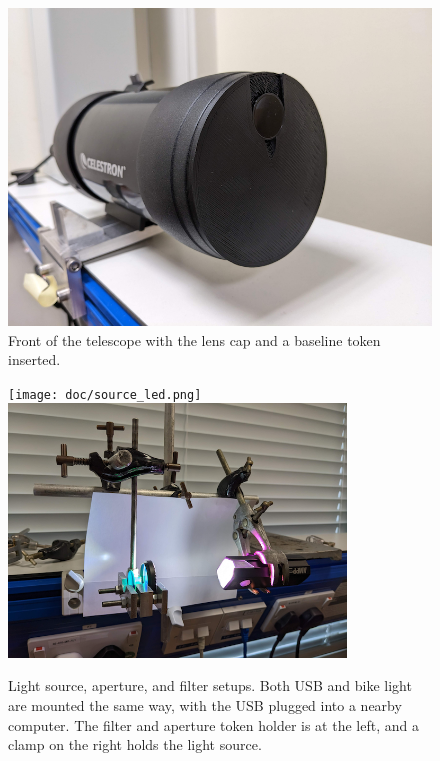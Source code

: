\documentclass[11pt]{article}
\begin{document}
\begin{figure}[h]
    \centering
    \includegraphics[width=1\textwidth]{doc/tel2.png}
    \caption{Front of the telescope with the lens cap and a baseline token inserted.}
    \label{fig:tel2}
\end{figure}

\begin{figure}[h]
    \centering
    \texttt{[image: doc/source\_led.png]}
    \includegraphics[width=0.8\textwidth]{doc/source.png}
    \caption{Light source, aperture, and filter setups. Both USB and bike light are mounted the same way, with the USB plugged into a nearby computer. The filter and aperture token holder is at the left, and a clamp on the right holds the light source.}
    \label{fig:source}
\end{figure}
\end{document}
